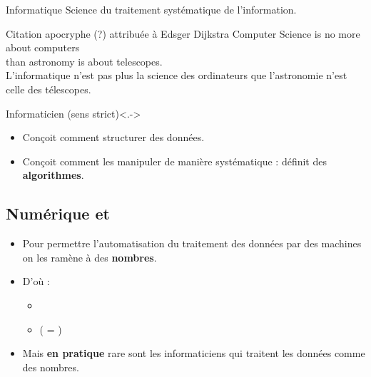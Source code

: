 \begin{slide}

	
	
	\begin{block}{Informatique}
	Science du traitement systématique de l'information.
	\end{block}
	
	
	\begin{exampleblock}{Citation apocryphe (?) attribuée à Edsger Dijkstra}%
	\centering
        Computer Science is no more about computers \\
        than astronomy is about telescopes.\\
	
        \medskip
	L'informatique n'est pas plus la science des ordinateurs que l'astronomie n'est celle des télescopes.
	\end{exampleblock}
	
\end{slide}

\begin{slide}
	\begin{block}{Informaticien (sens strict)}<.->
		\begin{itemize}
			\item Conçoit comment structurer des données.
			\item Conçoit comment les manipuler de manière systématique : définit des \textbf{algorithmes}.
		\end{itemize}
	\end{block}
\end{slide}
\subsection{Numérique et }

\begin{slide}

	\begin{itemize}
		\item Pour permettre l'automatisation du traitement des données par des machines on les ramène à des \textbf{nombres}.
		\item D'où :
			\begin{itemize}
				\item {}
				\item {} ( = )
			\end{itemize}
		\item Mais \textbf{en pratique} rare sont les informaticiens qui traitent les données comme des nombres. 
	\end{itemize}
\end{slide}

